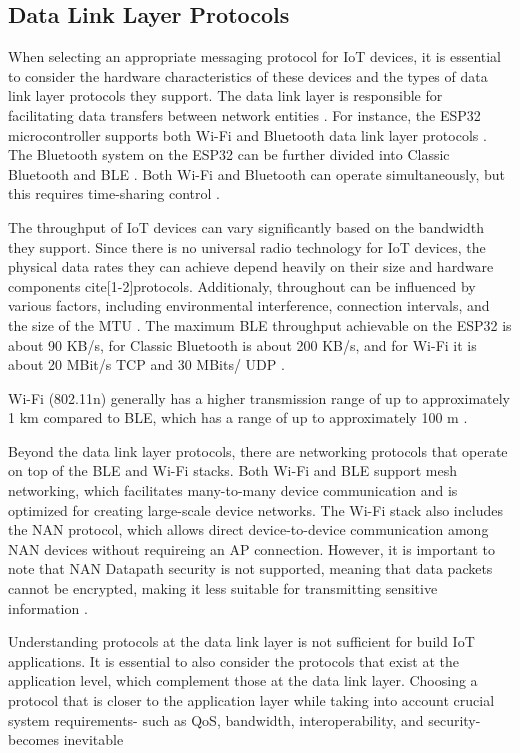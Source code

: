 \subsection{Data Link Layer Protocols}
When selecting an appropriate messaging protocol for \ac{IoT} devices, it is essential to consider the hardware characteristics of these devices and the types of data link layer protocols they support. The data link layer is responsible for facilitating data transfers between network entities \cite[1-3]{protocols}. For instance, the ESP32 microcontroller supports both Wi-Fi and Bluetooth data link layer protocols \cite{esp-prog}. The Bluetooth system on the ESP32 can be further divided into Classic Bluetooth and \ac{BLE} \cite{esp-prog} \cite{esp-faq}. Both Wi-Fi and Bluetooth can operate simultaneously, but this requires time-sharing control \cite[77]{esp-faq}.

The throughput of \ac{IoT} devices can vary significantly based on the bandwidth they support. Since there is no universal radio technology for \ac{IoT} devices, the physical data rates they can achieve depend heavily on their size and hardware components cite[1-2]{protocols}. Additionaly, throughout can be influenced by various factors, including environmental interference, connection intervals, and the size of the \ac{MTU} \cite{esp-faq}. The maximum \ac{BLE} throughput achievable on the ESP32 is about 90 KB/s, for Classic Bluetooth is about 200 KB/s, and for Wi-Fi it is about 20 MBit/s TCP and 30 MBits/ UDP \cite[38, 58,71]{esp-faq} \cite[2666]{esp-prog}. 


Wi-Fi (802.11n) generally has a higher transmission range of up to approximately 1 km compared to \ac{BLE}, which has a range of up to approximately 100 m \cite[3]{protocols}. 

Beyond the data link layer protocols, there are networking protocols that operate on top of the \ac{BLE} and Wi-Fi stacks. Both Wi-Fi and \ac{BLE} support mesh networking, which facilitates many-to-many device communication and is optimized for creating large-scale device networks. The Wi-Fi stack also includes the \ac{NAN} protocol, which allows direct device-to-device communication among \ac{NAN} devices without requireing an \ac{AP} connection. However, it is important to note that \ac{NAN} Datapath security is not supported, meaning that data packets cannot be encrypted, making it less suitable for transmitting sensitive information \cite[2694]{esp-prog}. 

Understanding protocols at the data link layer is not sufficient for build IoT applications. It is essential to also consider the protocols that exist at the application level, which complement those at the data link layer. Choosing a protocol that is closer to the application layer while taking into account crucial system requirements- such as \ac{QoS}, bandwidth, interoperability, and security- becomes inevitable \cite[2]{protocols}



